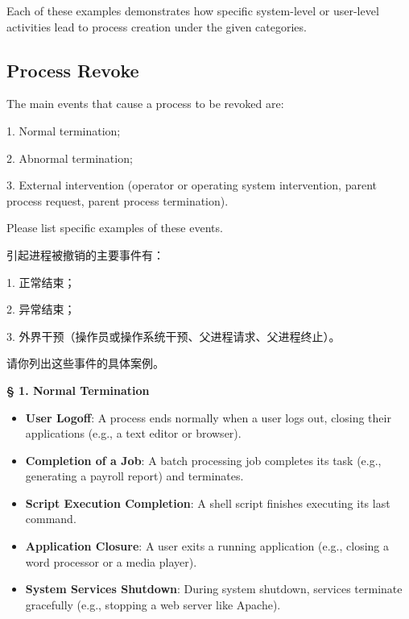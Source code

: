 \documentclass[a4paper]{book}
\newcommand{\sfbf}[1]{{\normalsize\textsf{\textbf{§ #1}}}}
\begin{document}
\hrulefill

Each of these examples demonstrates how specific system-level or user-level activities lead to process creation under the given categories.

\subsection{Process Revoke}

\begin{greenbox}
The main events that cause a process to be revoked are:

1. Normal termination;

2. Abnormal termination;

3. External intervention (operator or operating system intervention, parent process request, parent process termination).

Please list specific examples of these events.
\end{greenbox}

引起进程被撤销的主要事件有：

1. 正常结束；

2. 异常结束；

3. 外界干预（操作员或操作系统干预、父进程请求、父进程终止）。

请你列出这些事件的具体案例。

\sfbf{1. Normal Termination}

\begin{itemize}
\item 
\textbf{User Logoff}: A process ends normally when a user logs out, closing their applications (e.g., a text editor or browser).

\item 
\textbf{Completion of a Job}: A batch processing job completes its task (e.g., generating a payroll report) and terminates.

\item 
\textbf{Script Execution Completion}: A shell script finishes executing its last command.

\item 
\textbf{Application Closure}: A user exits a running application (e.g., closing a word processor or a media player).

\item 
\textbf{System Services Shutdown}: During system shutdown, services terminate gracefully (e.g., stopping a web server like Apache).

\end{itemize}
\end{document}
